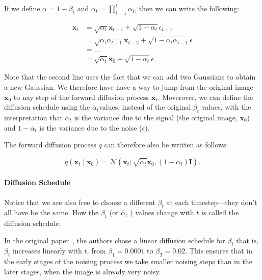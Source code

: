 If we define \( \alpha = 1 - \beta_t  \) and \( \overline{\alpha}_t  = \prod_{i=1}^{t} \alpha_i \), then we can write the following:

\begin{align*}
	\mathbf{x}_t & = \sqrt{\alpha_t} \mathbf{x}_{t-1} + \sqrt{1- \alpha_t} \epsilon_{t-1}                      \\
	             & = \sqrt{\alpha_t \alpha_{t-1}} \mathbf{x}_{t-2} + \sqrt{1- \alpha _t \alpha_{t-1}} \epsilon \\
	             & = \ldots                                                                                    \\
	             & = \sqrt{\overline{\alpha}_t}  \mathbf{x}_0 + \sqrt{1- \overline{\alpha }_t} \epsilon
	.\end{align*}


Note that the second line uses the fact that we can add two Gaussians to obtain a new Gaussian.
We therefore have have a way to jump from the original image \( \mathbf{x}_0 \) to nay step of the forward diffusion process \( \mathbf{x}_t \).
Moverover, we can define the diffusion schedule using the \( \overline{\alpha }_t \)values, instead of the original \( \beta _t \) values, with the interpretation that \( \overline{\alpha }_t \) is the variance due to the signal (the original image, \( \mathbf{x}_0 \)) and \( 1 - \overline{\alpha }_t \) is the variance due to the noise (\( \epsilon \)).

The forward diffusion process \( q \) can therefore also be written as follows:

\[
	q\left(\mathbf{x}_t  \mid  \mathbf{x}_0\right) = \mathcal{N}\left(\mathbf{x}_t; \sqrt{\overline{\alpha }_t } \mathbf{x}_0, \left(1 - \overline{\alpha }_t\right) \mathbf{I}\right)
	.\]

\paragraph{Diffusion Schedule}

Notice that we are also free to choose a different \( \beta_t \) at each timestep—they don’t all have be the same.
How the \( \beta_t \) (or \( \hat{\alpha}_t \) ) values change with \( t \) is called the diffusion schedule.

In the original paper~\cite{hoogeboom2021autoregressive}, the authors chose a linear diffusion schedule for \( \beta_t \) that is, \( \beta_t \) increases linearly with \( t \), from  \(  \beta_1 = 0.0001 \) to \( \beta_T = 0.02 \).
This ensures that in the early stages of the noising process we take smaller noising steps than in the later stages, when the image is already very noisy.


